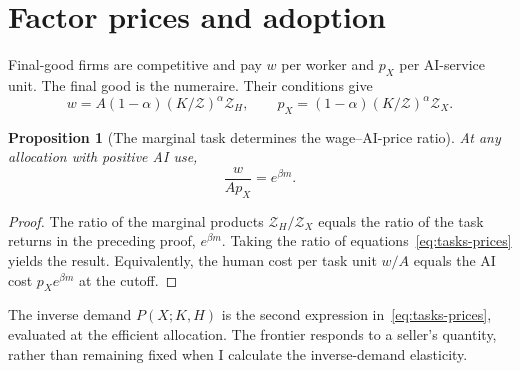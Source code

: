 \documentclass[11pt]{article}
\newtheorem{proposition}{Proposition}
\begin{document}
\section{Factor prices and adoption}
Final-good firms are competitive and pay $w$ per worker and $p_X$ per AI-service unit.
The final good is the numeraire. Their conditions give
\begin{equation}
 w=A(1-\alpha)(K/\mathcal Z)^\alpha\mathcal Z_H,\qquad
 p_X=(1-\alpha)(K/\mathcal Z)^\alpha\mathcal Z_X.
 \label{eq:tasks-prices}
\end{equation}
\begin{proposition}[The marginal task determines the wage--AI-price ratio]
At any allocation with positive AI use,
\begin{equation}
 \boxed{\frac{w}{A p_X}=e^{\beta m}.}
 \label{eq:tasks-wage-boundary}
\end{equation}
\end{proposition}
\begin{proof}
The ratio of the marginal products $\mathcal Z_H/\mathcal Z_X$ equals
the ratio of the task returns in the preceding proof, $e^{\beta m}$.
Taking the ratio of equations~\eqref{eq:tasks-prices} yields the result.
Equivalently, the human cost per task unit $w/A$ equals the AI cost
$p_Xe^{\beta m}$ at the cutoff.
\end{proof}

The inverse demand $P(X;K,H)$ is the second expression
in~\eqref{eq:tasks-prices}, evaluated at the efficient allocation.
The frontier responds to a seller's quantity, rather than remaining fixed
when I calculate the inverse-demand elasticity.
\end{document}

